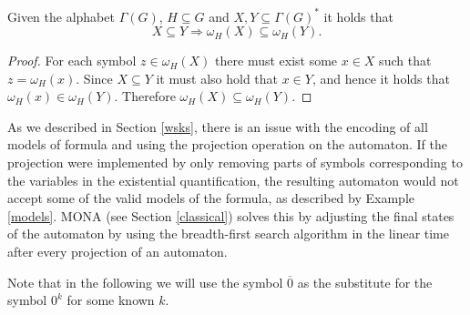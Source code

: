 \begin{lemma} Given the alphabet $\Gamma(G)$, $H \subseteq G$ and $X, Y
\subseteq \Gamma(G)^*$ it holds that
\begin{equation}
 X \subseteq Y \Longrightarrow \omega_H(X) \subseteq \omega_H(Y).
\end{equation}
\end{lemma}
\begin{proof}
For each symbol $z \in \omega_H(X)$ there must exist some $x \in X$ such that
$z = \omega_H(x)$. Since $X \subseteq Y$ it must also hold that $x \in Y$, and
hence it holds that $\omega_H(x) \in \omega_H(Y)$. Therefore $\omega_H(X)
\subseteq \omega_H(Y)$.
\end{proof}

As we described in Section \ref{wsks}, there is an issue with the encoding of
all models of formula and using the projection operation on the automaton. If
the projection were implemented by only removing parts of symbols corresponding to the
variables in the existential quantification, the resulting automaton
would not accept some of the valid models of the formula,
as described by Example \ref{models}. \textsc{MONA} (see Section
\ref{classical}) solves this by adjusting the final states of the automaton by
using the breadth-first search algorithm in the linear time after every
projection of an automaton.

Note that in the following we will use the symbol $\overline{0}$ as the
substitute for the symbol $0^k$ for some known $k$.


